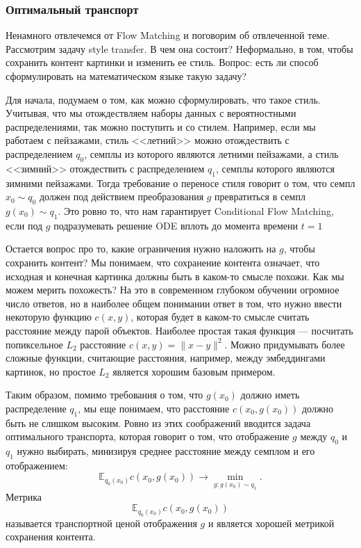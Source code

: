 \documentclass[12pt]{article}
\theoremstyle{definition}
\begin{document}
\subsubsection{Оптимальный транспорт}
Ненамного отвлечемся от Flow Matching и поговорим об отвлеченной теме. Рассмотрим задачу style transfer. В чем она состоит? Неформально, в том, чтобы сохранить контент картинки и изменить ее стиль. Вопрос: есть ли способ сформулировать на математическом языке такую задачу?

Для начала, подумаем о том, как можно сформулировать, что такое стиль. Учитывая, что мы отождествляем наборы данных с вероятностными распределениями, так можно поступить и со стилем. Например, если мы работаем с пейзажами, стиль <<летний>> можно отождествить с распределением $q_0$, семплы из которого являются летними пейзажами, а стиль <<зимний>> отождествить с распределением $q_1$, семплы которого являются зимними пейзажами. Тогда требование о переносе стиля говорит о том, что семпл $x_0 \sim q_0$ должен под действием преобразования $g$ превратиться в семпл $g(x_0) \sim q_1$. Это ровно то, что нам гарантирует Conditional Flow Matching, если под $g$ подразумевать решение ODE вплоть до момента времени $t=1$

Остается вопрос про то, какие ограничения нужно наложить на $g$, чтобы сохранить контент? Мы понимаем, что сохранение контента означает, что исходная и конечная картинка должны быть в каком-то смысле похожи. Как мы можем мерить похожесть? На это в современном глубоком обучении огромное число ответов, но в наиболее общем понимании ответ в том, что нужно ввести некоторую функцию $c(x, y)$, которая будет в каком-то смысле считать расстояние между парой объектов. Наиболее простая такая функция --- посчитать попиксельное $L_2$ расстояние $c(x, y) = \|x - y\|^2$. Можно придумывать более сложные функции, считающие расстояния, например, между эмбеддингами картинок, но простое $L_2$ является хорошим базовым примером.

Таким образом, помимо требования о том, что $g(x_0)$ должно иметь распределение $q_1$, мы еще понимаем, что расстояние $c(x_0, g(x_0))$ должно быть не слишком высоким. Ровно из этих соображений вводится задача оптимального транспорта, которая говорит о том, что отображение $g$ между $q_0$ и $q_1$ нужно выбирать, минизируя среднее расстояние между семплом и его отображением:
\[
    \mathbb{E}_{q_0(x_0)} c\left(x_0, g(x_0)\right) \rightarrow \min\limits_{g: g(x_0) \sim q_1}.
\]
Метрика
\[
    \mathbb{E}_{q_0(x_0)}c\left(x_0, g(x_0)\right)
\]
называется транспортной ценой отображения $g$ и является хорошей метрикой сохранения контента. 
\end{document}
